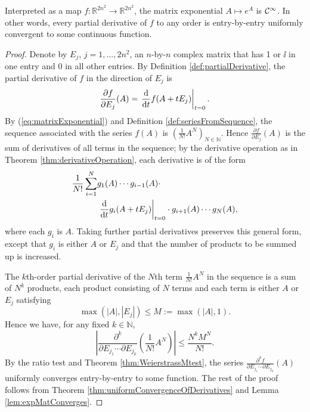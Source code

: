 \begin{thm}
  \label{thm:matExpSmooth}
  Interpreted as a map $f: \mathbb{R}^{2n^2}\rightarrow \mathbb{R}^{2n^2}$,
   the matrix exponential $A\mapsto e^A$ is ${\cal C}^{\infty}$.
  In other words,
   every partial derivative of $f$
   to any order is entry-by-entry uniformly convergent
   to some continuous function.
\end{thm}
\begin{proof}
  Denote by $E_j$, $j=1,\ldots,2n^2$, 
  an $n$-by-$n$ complex matrix that has 1 or $\ii$ in one entry
  and 0 in all other entries.
  By Definition \ref{def:partialDerivative},
  the partial derivative of $f$ in the direction of $E_j$
  is
  \begin{displaymath}
    \frac{\partial f}{\partial E_j}(A)
    = \left. \frac{\mathrm{d} }{\mathrm{d} t} f(A+tE_j)\right|_{t=0}.
  \end{displaymath}
  By (\ref{eq:matrixExponential}) and Definition \ref{def:seriesFromSequence},
  the sequence associated with the series $f(A)$ is
  $(\frac{1}{N!}A^N)_{N\in \mathbb{N}}$.
  Hence 
  $\frac{\partial f}{\partial E_j}(A)$ is the sum
  of derivatives of all terms in the sequence; 
  by the derivative operation as in Theorem \ref{thm:derivativeOperation},
  each derivative is of the form
  \begin{align*}
    \frac{1}{N!}\sum_{i=1}^N &g_1(A)\cdots g_{i-1}(A)\cdot\\
    &\left. \frac{\mathrm{d} }{\mathrm{d} t} g_i(A+tE_j)\right|_{t=0}
    \cdot g_{i+1}(A)\cdots g_N(A),
  \end{align*}
  where each $g_i$ is $A$. %
  Taking further partial derivatives preserves this general form,
  except that $g_i$ is either $A$ or $E_j$
  and that the number of products to be summed up is increased.
  
  The $k$th-order partial derivative of
  the $N$th term $\frac{1}{N!}A^N$ in the sequence
  is a sum of $N^k$ products,
  each product consisting of $N$ terms
  and each term is either $A$ or $E_j$
  satisfying
  \begin{displaymath}
    \max(|A|, |E_j|)\le M := \max(|A|,1).
  \end{displaymath}
  Hence we have, for any fixed $k\in \mathbb{N}$, 
  \begin{displaymath}
    \left|
      \frac{\partial^k }{\partial E_{j_1}\cdots \partial E_{j_k}}
      \left(\frac{1}{N!}A^N\right)
    \right|
    \le \frac{N^k M^N}{N!}.
  \end{displaymath}
  By the ratio test and Theorem \ref{thm:WeierstrassMtest}, 
  the series $\frac{\partial^k f}{\partial E_{j_1}\cdots
    \partial E_{j_k}}(A)$
  uniformly converges entry-by-entry to some function. 
  The rest of the proof follows from
  Theorem \ref{thm:uniformConvergenceOfDerivatives}
  and Lemma \ref{lem:expMatConverges}.
\end{proof}

